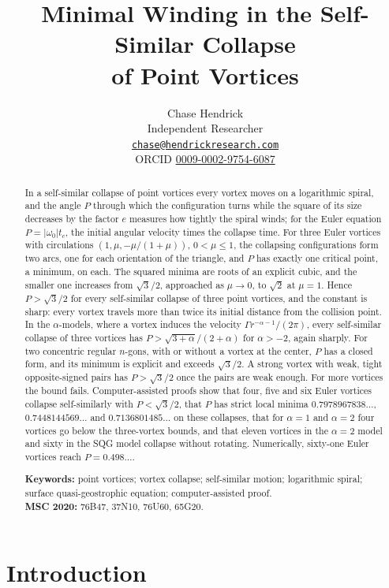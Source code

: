 \documentclass[11pt]{article}
\title{\Large\bfseries Minimal Winding in the Self-Similar Collapse\\
  of Point Vortices}
\author{Chase Hendrick\\[0.2em] {\small Independent Researcher}\\ {\small\href{mailto:chase@hendrickresearch.com}{\texttt{chase@hendrickresearch.com}}}\\ {\small ORCID \href{https://orcid.org/0009-0002-9754-6087}{0009-0002-9754-6087}}}
\date{}
\theoremstyle{definition}
\begin{document}
\maketitle

\begin{abstract}
In a self-similar collapse of point vortices every vortex moves on a logarithmic spiral, and the angle $P$ through which the configuration turns while the square of its size decreases by the factor $e$ measures how tightly the spiral winds; for the Euler equation $P = |\omega_0| t_c$, the initial angular velocity times the collapse time. For three Euler vortices with circulations $(1, \mu, -\mu/(1 + \mu))$, $0 < \mu \le 1$, the collapsing configurations form two arcs, one for each orientation of the triangle, and $P$ has exactly one critical point, a minimum, on each. The squared minima are roots of an explicit cubic, and the smaller one increases from $\sqrt{3}/2$, approached as $\mu \to 0$, to $\sqrt{2}$ at $\mu = 1$. Hence $P > \sqrt{3}/2$ for every self-similar collapse of three point vortices, and the constant is sharp: every vortex travels more than twice its initial distance from the collision point. In the $\alpha$-models, where a vortex induces the velocity $\Gamma r^{-\alpha-1}/(2\pi)$, every self-similar collapse of three vortices has $P > \sqrt{3 + \alpha}/(2 + \alpha)$ for $\alpha > -2$, again sharply. For two concentric regular $n$-gons, with or without a vortex at the center, $P$ has a closed form, and its minimum is explicit and exceeds $\sqrt{3}/2$. A strong vortex with weak, tight opposite-signed pairs has $P > \sqrt{3}/2$ once the pairs are weak enough. For more vortices the bound fails. Computer-assisted proofs show that four, five and six Euler vortices collapse self-similarly with $P < \sqrt{3}/2$, that $P$ has strict local minima $0.7978967838\ldots$, $0.7448144569\ldots$ and $0.7136801485\ldots$ on these collapses, that for $\alpha = 1$ and $\alpha = 2$ four vortices go below the three-vortex bounds, and that eleven vortices in the $\alpha = 2$ model and sixty in the SQG model collapse without rotating. Numerically, sixty-one Euler vortices reach $P = 0.498\ldots$.

\medskip
\noindent\textbf{Keywords:} point vortices; vortex collapse; self-similar motion; logarithmic spiral; surface quasi-geostrophic equation; computer-assisted proof.\\
\textbf{MSC 2020:} 76B47, 37N10, 76U60, 65G20.
\end{abstract}

\section{Introduction}
\end{document}
